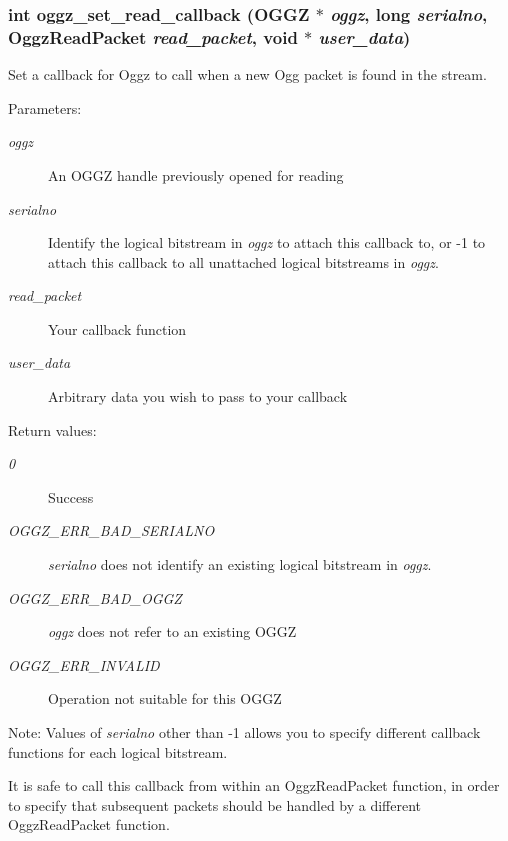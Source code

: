 \subsubsection{\setlength{\rightskip}{0pt plus 5cm}int oggz\_\-set\_\-read\_\-callback ({\bf OGGZ} $\ast$ {\em oggz}, long {\em serialno}, {\bf Oggz\-Read\-Packet} {\em read\_\-packet}, void $\ast$ {\em user\_\-data})}\label{group__read__api_a1}


Set a callback for Oggz to call when a new Ogg packet is found in the stream. 

\begin{Desc}
\item[Parameters:]
\begin{description}
\item[{\em oggz}]An OGGZ handle previously opened for reading \item[{\em serialno}]Identify the logical bitstream in {\em oggz\/} to attach this callback to, or -1 to attach this callback to all unattached logical bitstreams in {\em oggz\/}. \item[{\em read\_\-packet}]Your callback function \item[{\em user\_\-data}]Arbitrary data you wish to pass to your callback \end{description}
\end{Desc}
\begin{Desc}
\item[Return values:]
\begin{description}
\item[{\em 0}]Success \item[{\em OGGZ\_\-ERR\_\-BAD\_\-SERIALNO}]{\em serialno\/} does not identify an existing logical bitstream in {\em oggz\/}. \item[{\em OGGZ\_\-ERR\_\-BAD\_\-OGGZ}]{\em oggz\/} does not refer to an existing OGGZ \item[{\em OGGZ\_\-ERR\_\-INVALID}]Operation not suitable for this OGGZ\end{description}
\end{Desc}
\begin{Desc}
\item[Note:]Values of {\em serialno\/} other than -1 allows you to specify different callback functions for each logical bitstream.

It is safe to call this callback from within an Oggz\-Read\-Packet function, in order to specify that subsequent packets should be handled by a different Oggz\-Read\-Packet function. \end{Desc}
